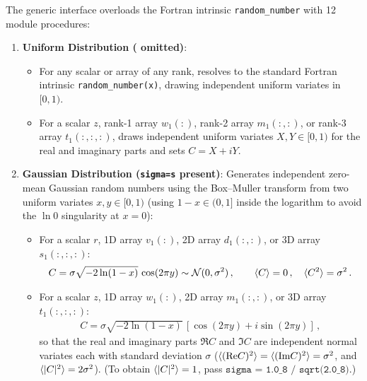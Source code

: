 The generic interface  overloads the Fortran intrinsic \texttt{random\_number} with 12 module procedures:
\begin{enumerate}
  \item \textbf{Uniform Distribution ( omitted)}:
  \begin{itemize}
    \item For any  scalar or array of any rank, resolves to the standard Fortran intrinsic \texttt{random\_number(x)}, drawing independent uniform variates in $[0,1)$.
    \item For a  scalar $z$, rank-1 array $w_1(:)$, rank-2 array $m_1(:,:)$, or rank-3 array $t_1(:,:,:)$, draws independent uniform variates $X, Y \in [0,1)$ for the real and imaginary parts and sets $C = X + i Y$.
  \end{itemize}
  \item \textbf{Gaussian Distribution (\texttt{sigma=s} present)}:
  Generates independent zero-mean Gaussian random numbers using the Box--Muller transform from two uniform variates $x, y \in [0,1)$ (using $1 - x \in (0,1]$ inside the logarithm to avoid the $\ln 0$ singularity at $x = 0$):
  \begin{itemize}
    \item For a  scalar $r$, 1D array $v_1(:)$, 2D array $d_1(:,:)$, or 3D array $s_1(:,:,:)$:
    \begin{align}
      C = \sigma \sqrt{-2\ln(1 - x)}\,\cos(2\pi y) \sim \mathcal{N}(0, \sigma^2)\, , \qquad \langle C \rangle = 0\, , \quad \langle C^2 \rangle = \sigma^2\, .
    \end{align}
    \item For a  scalar $z$, 1D array $w_1(:)$, 2D array $m_1(:,:)$, or 3D array $t_1(:,:,:)$:
    \begin{align}
      C = \sigma \sqrt{-2\ln(1 - x)}\,\left[\cos(2\pi y) + i\sin(2\pi y)\right]\, ,
    \end{align}
    so that the real and imaginary parts $\Re C$ and $\Im C$ are independent normal variates each with standard deviation $\sigma$ ($\langle (\mbox{Re} C)^2 \rangle = \langle (\mbox{Im} C)^2 \rangle = \sigma^2$, and $\langle |C|^2 \rangle = 2\sigma^2$). (To obtain $\langle |C|^2 \rangle = 1$, pass $\texttt{sigma = 1.0\_8 / sqrt(2.0\_8)}$.)
  \end{itemize}
\end{enumerate}

\begin{description}[leftmargin=2.2cm, style=nextline]
\end{description}

